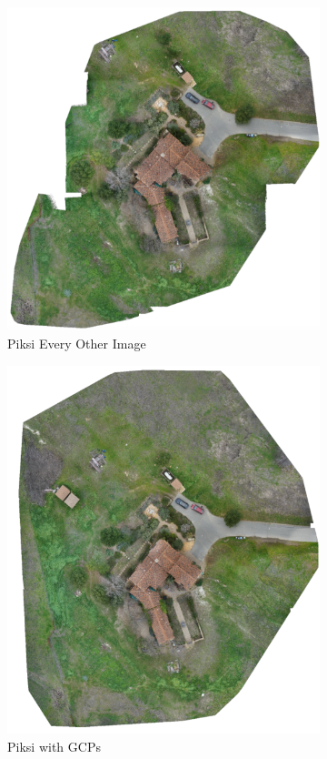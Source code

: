 \documentclass{article}
\begin{document}
\begin{figure}
\begin{subfigure}{.33\textwidth}
  \label{fig:sub2}
\end{subfigure}
\begin{subfigure}{.33\textwidth}
  \centering
  \includegraphics[width=.72\linewidth]{images/orthomosaics/p_every_other_image.png}
  \caption{Piksi Every Other Image}
  \label{fig:sub1}
\end{subfigure}%
\begin{subfigure}{.33\textwidth}
  \centering
  \includegraphics[width=.72\linewidth]{images/orthomosaics/p_gcp.png}
  \caption{Piksi with GCPs}
  \label{fig:sub1}
\end{subfigure}%
\begin{subfigure}{.33\textwidth}

\end{subfigure}
\end{figure}
\end{document}
